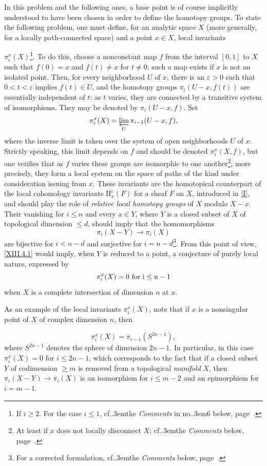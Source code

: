 \documentclass[11pt,a4paper,oneside]{book}
\providecommand{\sisi}[2]{#2}
\providecommand{\pageoriginale}{%
  \refstepcounter{pageoriginal}%
  \marginpar{\raggedright\footnotesize\bfseries\thepageoriginal}%
  \xspace}
\providecommand{\sfootnote}[1]{\footnote{#1}}
\providecommand{\cf}{cf.\kern.3em}
\providecommand{\numero}{no.\kern.3em}
\renewcommand{\H}{\mathrm H}
\theoremstyle{plain}
\theoremstyle{definition}
\theoremstyle{remark}
\renewcommand{\Ref}[1]{\textup{\ref{#1}}}
\begin{document}
In this problem and the \sisi{preceding}{following} ones, a base point
is of course implicitly understood to have been chosen in order to
define the homotopy groups. To state the following problem, one must
define, for an analytic space $X$ (more generally, for a locally
path-connected space) and a point $x\in X$, local invariants\pageoriginale
$\pi_i^x(X)$\sfootnote{If $i\geq2$. For the case $i\leq1$, \cf the
\emph{Comments} in \numero 6 below, page~\pageref{p25y}.}.
\label{pagexpo} To do this, choose a nonconstant map
$f$ from the interval $[0,1]$ to $X$ such that $f(0)=x$ and $f(t)\neq x$
for $t\neq0$; such a map exists if $x$ is not an isolated point. Then,
for every neighborhood $U$ of $x$, there is an $\varepsilon>0$ such that
$0<t<\varepsilon$ implies $f(t)\in U$, and the homotopy groups
$\pi_i(U-x,f(t))$ are essentially independent of $t$: as $t$ varies,
they are connected by a transitive system of isomorphisms. They may be
denoted by $\pi_i(U-x,f)$. Set\label{pip15}\label{pXIII.15}
$$
\pi_i^x(X)=\varprojlim_U\pi_{i-1}(U-x,f),
$$
where the inverse limit is taken over the system of open neighborhoods
$U$ of $x$. Strictly speaking, this limit depends on $f$ and should be
denoted $\pi_i^x(X,f)$, but one verifies that as $f$ varies these groups
are isomorphic to one another\sfootnote{At least if $x$ does not locally
disconnect $X$; \cf the \emph{Comments} below, page~\pageref{p25y}.};
more precisely, they form a local system on the space of paths of the
kind under consideration issuing from $x$. These invariants are the
homotopical counterpart of the local cohomology invariants $\H_x^i(F)$
for a sheaf $F$ on $X$, introduced in \Ref{I}, and should play the role
of \emph{relative local homotopy groups} of $X$ modulo $X-x$. Their
vanishing for $i\leq n$ and every $x\in Y$, where $Y$ is a closed subset
of $X$ of topological dimension $\leq d$, should imply that the
homomorphisms
$$
\pi_i(X-Y)\to\pi_i(X)
$$
are bijective for $i<n-d$ and surjective for
$i=n-d$\sfootnote{For a corrected formulation, \cf the \emph{Comments}
below, page~\pageref{p25y}.}. From this point of view,
\Ref{XIII.4.1} would imply, when $Y$ is reduced to a point, a conjecture
of purely local nature, expressed by
$$
\pi_i^x(X)=0\ \rm{for}\ i\leq n-1\label{p15l}
$$
when $X$ is a complete intersection of dimension $n$ at $x$.

\sisi{As}{As} an example of the local invariants $\pi_i^x(X)$, note that
if $x$ is a nonsingular point of \sisi{\ignorespaces}{$X$ of} complex
dimension $n$, then\pageoriginale
$$
\pi_i^x(X)=\pi_{i-1}(S^{2n-1}),
$$
where $S^{2n-1}$ denotes the sphere of dimension $2n-1$. In particular,
in this case $\pi_i^x(X)=0$ for $i\leq2n-1$, which corresponds to the
fact that if a closed subset $Y$ of codimension $\geq m$ is removed from
a topological \emph{manifold} $X$, then
$\pi_i(X-Y)\to\pi_i(X)$ is an isomorphism for $i\leq m-2$ and an
epimorphism for $i=m-1$.
\end{document}
